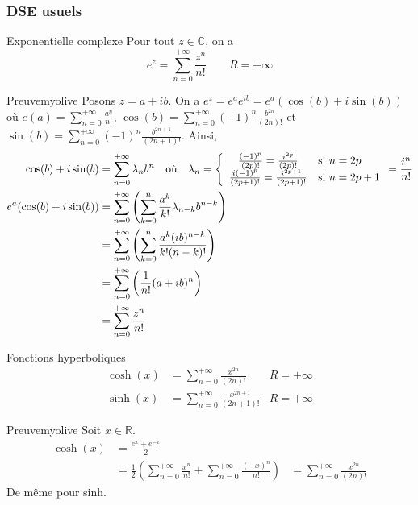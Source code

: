     \subsubsection{DSE usuels}

    \begin{prop}{Exponentielle complexe}{}
        Pour tout $z \in \mathbb{C}$, on a 
        \[ e^z = \sum_{n=0}^{+\infty} \frac{z^n}{n!} \qquad R = +\infty \]
    \end{prop}

    \begin{demo}{Preuve}{myolive}
        Posons $z = a + ib$. On a $e^z = e^a e^{ib} = e^a (\cos(b) + i \sin(b))$ où $e(a) = \sum_{n=0}^{+\infty} \frac{a^n}{n!}$, $\cos(b) = \sum_{n=0}^{+\infty} (-1)^n \frac{b^{2n}}{(2n)!}$ et $\sin(b) = \sum_{n=0}^{+\infty} (-1)^n \frac{b^{2n+1}}{(2n+1)!}$. Ainsi,
        \begin{align*}
            \cos(b) + i \sin(b) &= \sum_{n=0}^{+\infty} \lambda_n b^n \esp{où} \lambda_n = \sisi{\frac{(-1)^p}{(2p)!} = \frac{i^{2p}}{(2p)!}}{n = 2p}{\frac{i(-1)^p}{(2p+1)!} = \frac{i^{2p+1}}{(2p+1)!}}{n = 2p + 1} = \frac{i^{n}}{n!} \\
            e^a (\cos(b) + i \sin(b)) 
            &= \sum_{n=0}^{+\infty} \left(\sum_{k=0}^n \frac{a^k}{k!} \lambda_{n-k} b^{n-k}\right) \\
            &= \sum_{n=0}^{+\infty} \left(\sum_{k=0}^{n} \frac{a^k (ib)^{n-k}}{k! (n-k)!}\right) \\
            &= \sum_{n=0}^{+\infty} \left(\frac{1}{n!} (a + ib)^n \right) \\
            &= \sum_{n=0}^{+\infty} \frac{z^n}{n!}
        \end{align*}
    \end{demo}

    \begin{prop}{Fonctions hyperboliques}{}
        \begin{align*}
            \cosh(x) &= \sum_{n=0}^{+\infty} \frac{x^{2n}}{(2n)!} & R = +\infty \\
            \sinh(x) &= \sum_{n=0}^{+\infty} \frac{x^{2n+1}}{(2n+1)!} & R = +\infty
        \end{align*}
    \end{prop}

    \begin{demo}{Preuve}{myolive}
        Soit $x \in \mathbb{R}$. 
        \begin{align*}
            \cosh(x) 
            &= \frac{e^x + e^{-x}}{2} \\
            &= \frac{1}{2} \left( \sum_{n=0}^{+\infty} \frac{x^n}{n!} + \sum_{n=0}^{+\infty} \frac{(-x)^n}{n!} \right)
            &= \sum_{n=0}^{+\infty} \frac{x^{2n}}{(2n)!}
        \end{align*}
        De même pour sinh.
    \end{demo}

